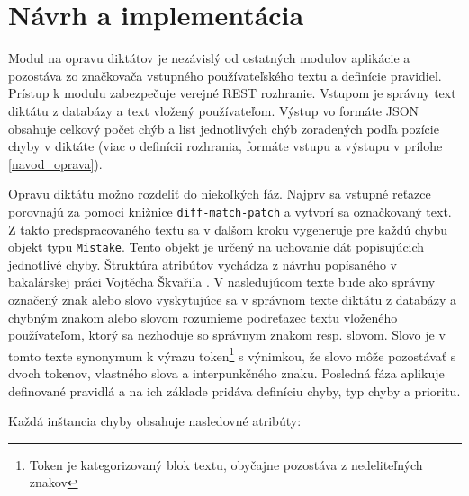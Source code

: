 \documentclass[12pt,oneside]{fithesis2}
\begin{document}
      \section{Návrh a implementácia}
      \par Modul na opravu diktátov je nezávislý od ostatných modulov aplikácie a pozostáva zo značkovača vstupného používateľského textu a definície pravidiel. Prístup k modulu zabezpečuje verejné REST rozhranie. Vstupom je správny text diktátu z databázy a text vložený používateľom. Výstup vo formáte JSON obsahuje celkový počet chýb a list jednotlivých chýb zoradených podľa pozície chyby v diktáte (viac o definícii rozhrania, formáte vstupu a výstupu v prílohe \ref{navod_oprava}). 
      \par Opravu diktátu možno rozdeliť do niekoľkých fáz. Najprv sa vstupné reťazce porovnajú za pomoci knižnice \texttt{diff-match-patch}\cite{diffmatchpatch} a vytvorí sa označkovaný text. Z takto predspracovaného textu sa v ďalšom kroku vygeneruje pre každú chybu objekt typu \texttt{Mistake}. Tento objekt je určený na uchovanie dát popisujúcich jednotlivé chyby. Štruktúra atribútov vychádza z návrhu popísaného v bakalárskej práci Vojtěcha Škvařila \cite{skvaril14}. V nasledujúcom texte bude ako správny označený znak alebo slovo vyskytujúce sa v správnom texte diktátu z databázy a chybným znakom alebo slovom rozumieme podreťazec textu vloženého používateľom, ktorý sa nezhoduje so správnym znakom resp. slovom. Slovo je v tomto texte synonymum k výrazu token\footnote{Token je kategorizovaný blok textu, obyčajne pozostáva z nedeliteľných znakov} s výnimkou, že slovo môže pozostávať s dvoch tokenov, vlastného slova a interpunkčného znaku. Posledná fáza aplikuje definované pravidlá a na ich základe pridáva definíciu chyby, typ chyby a prioritu.
\par Každá inštancia chyby obsahuje nasledovné atribúty:
\end{document}
